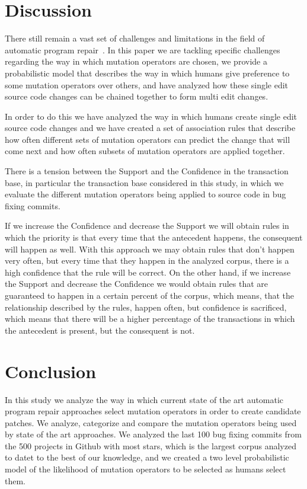 \documentclass[conference]{IEEEtran}
\begin{document}
\section{Discussion}
There still remain a vast set of challenges and limitations in the field of 
automatic program repair~\cite{Qi15}. In this paper we are tackling specific 
challenges regarding the way in which mutation operators are chosen, we provide 
a probabilistic model that describes the way in which humans give preference to 
some mutation operators over others, and have analyzed how these single edit 
source code changes can be chained together to form multi edit changes.

In order to do this we have analyzed the way in which humans create single edit 
source code changes and we have created a set of association rules that describe 
how often different sets of mutation operators can predict the change that will 
come next and how often subsets of mutation operators are applied together.

There is a tension between the Support and the Confidence in the transaction 
base, in particular the transaction base considered in this study, in which we 
evaluate the different mutation operators being applied to source code in bug 
fixing commits. 

If we increase the Confidence and decrease the Support we will obtain rules in 
which the priority is that every time that the antecedent happens, the 
consequent will happen as well. With this approach we may obtain rules that 
don't happen very often, but every time that they happen in the analyzed corpus, 
there is a high confidence that the rule will be correct. On the other hand, if 
we increase the Support and decrease the Confidence we would obtain rules that 
are guaranteed to happen in a certain percent of the corpus, which means, that 
the relationship described by the rules, happen often, but confidence is 
sacrificed, which means that there will be a higher percentage of the 
transactions in which the antecedent is present, but the consequent is not. 


\section{Conclusion}
In this study we analyze the way in which current state of the art automatic 
program repair approaches select mutation operators in order to create candidate 
patches. We analyze, categorize and compare the mutation operators being used by 
state of the art approaches. We analyzed the last 100 bug fixing commits from the
500 projects in Github with most stars, which is the largest corpus analyzed to datet
to the best of our knowledge, and we created a two level probabilistic model of
the likelihood of mutation operators to be selected as humans select them.
\end{document}
